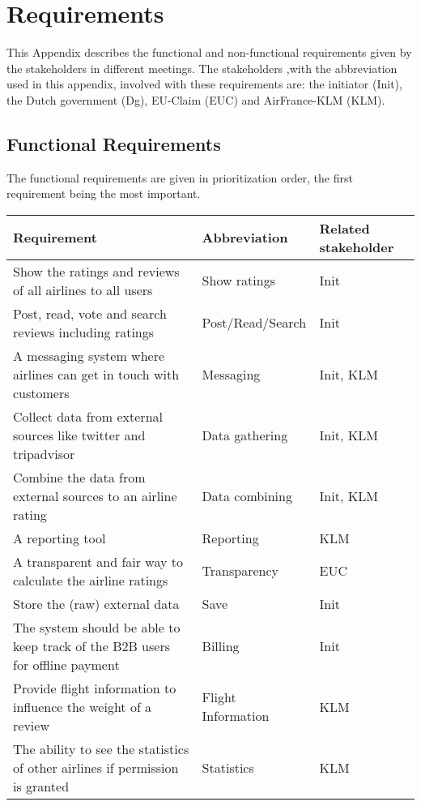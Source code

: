 \section{Requirements}
This Appendix describes the functional and non-functional requirements given by the stakeholders in different meetings. The stakeholders ,with the abbreviation used in this appendix, involved with these requirements are: the initiator (Init), the Dutch government (Dg), EU-Claim (EUC) and AirFrance-KLM (KLM). 

\subsection*{Functional Requirements}
The functional requirements are given in prioritization order, the first requirement being the most important. 

\begin{longtable}{| p{10cm}| l | l |}
\hline
\textbf{Requirement} & \textbf{Abbreviation} & \textbf{Related stakeholder} \\ \hline
Show the ratings and reviews of all airlines to all users & Show ratings & Init \\ \hline
Post, read, vote and search reviews including ratings & Post/Read/Search & Init \\ \hline
A messaging system where airlines can get in touch with customers & Messaging & Init, KLM \\ \hline
Collect data from external sources like twitter and tripadvisor & Data gathering & Init, KLM \\ \hline
Combine the data from external sources to an airline rating & Data combining & Init, KLM \\ \hline
A reporting tool & Reporting & KLM \\ \hline
A transparent and fair way to calculate the airline ratings & Transparency & EUC \\ \hline
Store the (raw) external data & Save & Init \\ \hline
The system should be able to keep track of the B2B users for offline payment & Billing & Init \\ \hline
Provide flight information to influence the weight of a review & Flight Information & KLM \\ \hline
The ability to see the statistics of other airlines if permission is granted & Statistics & KLM \\ \hline 

\end{longtable}

